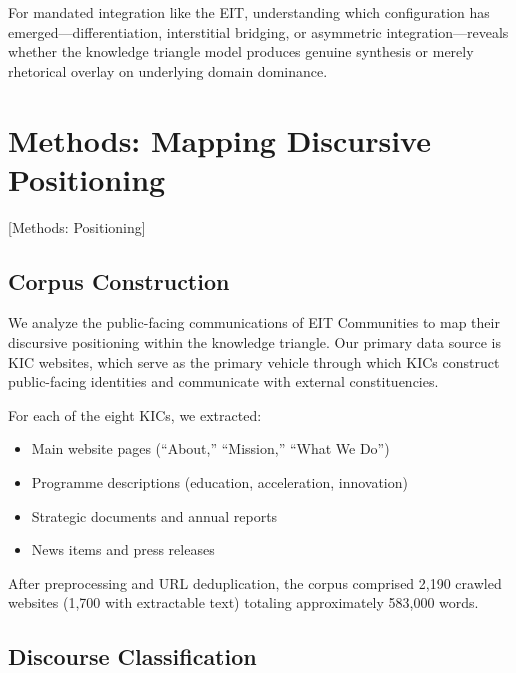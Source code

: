 \documentclass[../main.tex]{subfiles}
\begin{document}
For mandated integration like the EIT, understanding which configuration has emerged---differentiation, interstitial bridging, or asymmetric integration---reveals whether the knowledge triangle model produces genuine synthesis or merely rhetorical overlay on underlying domain dominance.


\section{Methods: Mapping Discursive Positioning}[Methods: Positioning]

\subsection{Corpus Construction}

We analyze the public-facing communications of EIT Communities to map their discursive positioning within the knowledge triangle. Our primary data source is KIC websites, which serve as the primary vehicle through which KICs construct public-facing identities and communicate with external constituencies.

For each of the eight KICs, we extracted:

\begin{itemize}
    \item Main website pages (``About,'' ``Mission,'' ``What We Do'')
    \item Programme descriptions (education, acceleration, innovation)
    \item Strategic documents and annual reports
    \item News items and press releases
\end{itemize}

After preprocessing and URL deduplication, the corpus comprised 2,190 crawled websites (1,700 with extractable text) totaling approximately 583,000 words.

\subsection{Discourse Classification}
\end{document}
